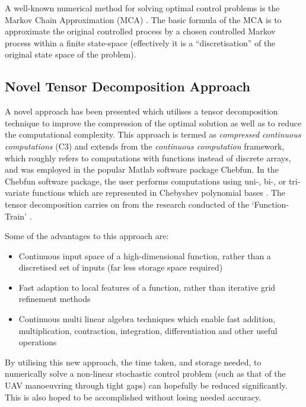 \documentclass[11pt,draftd]{article}
\begin{document}
\noindent A well-known numerical method for solving optimal control problems is the Markov Chain Approximation (MCA) \cite{kushner}. The basic formula of the MCA is to approximate the original controlled process by a chosen controlled Markov process within a finite state-space (effectively it is a “discretisation” of the original state space of the problem). \\

\subsection{Novel Tensor Decomposition Approach}
A novel approach has been presented which utilises a tensor decomposition technique to improve the compression of the optimal solution as well as to reduce the computational complexity. This approach is termed as \textit{compressed continuous computations} (C3) and extends from the \textit{continuous computation} framework, which roughly refers to computations with functions instead of discrete arrays, and was employed in the popular Matlab software package Chebfun. In the Chebfun software package, the user performs computations using uni-, bi-, or tri-variate functions which are represented in Chebyshev polynomial bases \cite{chebfun}. The tensor decomposition carries on from the research conducted of the ‘Function-Train’ \cite{ft-alex}.

Some of the advantages to this approach are:
\begin{itemize}
	\item Continuous input space of a high-dimensional function, rather than a discretised set of inputs (far less storage space required)
	\item Fast adaption to local features of a function, rather than iterative grid refinement methods
	\item Continuous multi linear algebra techniques which enable fast addition, multiplication, contraction, integration, differentiation and other useful operations
\end{itemize}
\noindent By utilising this new approach, the time taken, and storage needed, to numerically solve a non-linear stochastic control problem (such as that of the UAV manoeuvring through tight gaps) can hopefully be reduced significantly. This is also hoped to be accomplished without losing needed accuracy.\\
\end{document}
